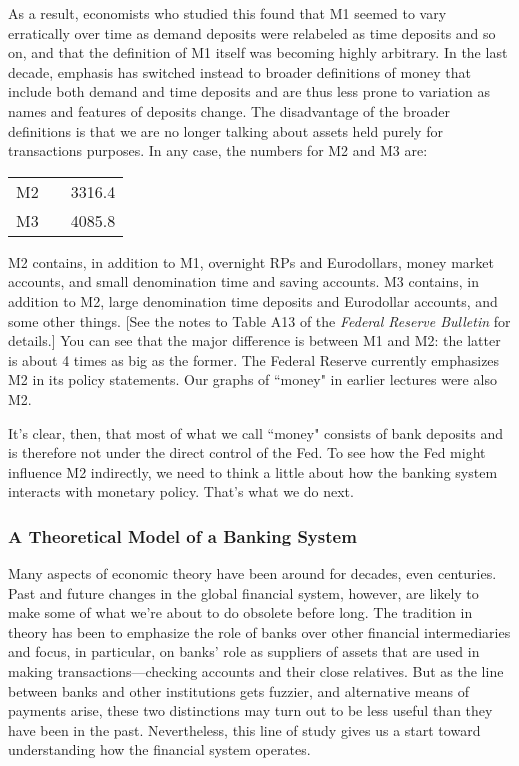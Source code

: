 \documentclass[letterpaper,12pt]{article}
\begin{document}
     As a result, economists who studied this found that M1 seemed to vary
erratically over time as demand deposits were relabeled as time deposits and so on, and that the
definition of M1 itself was becoming highly arbitrary. In the last decade, emphasis has switched
instead to broader definitions of money that include both demand and time deposits and are thus
less prone to variation as names and features of deposits change.  The disadvantage of the broader
definitions is that we are no longer talking about assets held purely for transactions purposes.
In any case, the numbers for M2 and M3 are:
%
\begin{center}
\begin{tabular}{lcr}
                              M2      & &    3316.4   \\
                              M3      & &    4085.8   \\
\end{tabular}
\end{center}
%
M2 contains, in addition to M1, overnight RPs and Eurodollars, money market accounts, and small
denomination time and saving accounts.  M3 contains, in addition to M2, large denomination time
deposits and Eurodollar accounts, and some other things.  [See the notes to Table A13 of the {\em
Federal Reserve Bulletin} for details.]  You can see that the major difference is between M1 and
M2:  the latter is about 4 times as big as the former.  The Federal Reserve currently emphasizes
M2 in its policy statements.  Our graphs of ``money" in earlier lectures were also M2.

     It's clear, then, that most of what we call ``money" consists of bank
deposits and is therefore not under the direct control of the Fed.  To see how the Fed might
influence M2 indirectly, we need to think a little about how the banking system interacts with
monetary policy.  That's what we do next.


\subsubsection*{A Theoretical Model of a Banking System}

     Many aspects of economic theory have been around for decades, even
centuries.  Past and future changes in the global financial system, however, are likely to make
some of what we're about to do obsolete before long.  The tradition in theory has been to
emphasize the role of banks over other financial intermediaries and focus, in particular, on
banks' role as suppliers of assets that are used in making transactions---checking accounts and
their close relatives.  But as the line between banks and other institutions gets fuzzier, and
alternative means of payments arise, these two distinctions may turn out to be less useful than
they have been in the past. Nevertheless, this line of study gives us a start toward understanding
how the financial system operates.
\end{document}
